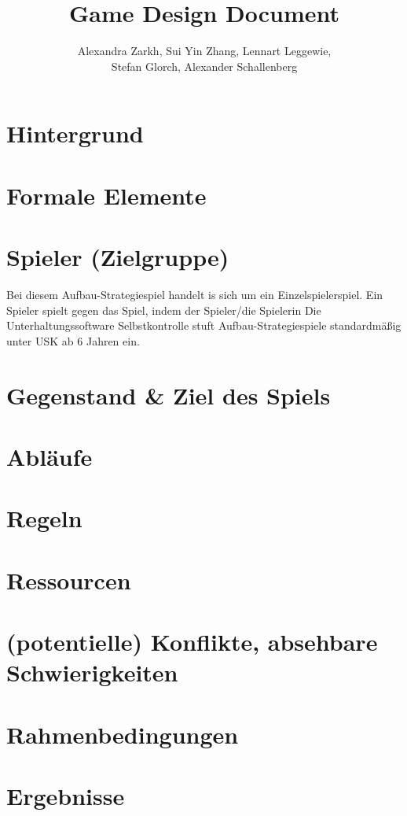 \documentclass[paper=A4,pagesize=auto,12pt,headinclude=true,footinclude=true,BCOR=0mm,DIV=calc]{scrartcl}
\title{Game Design Document}
\author{Alexandra Zarkh, Sui Yin Zhang, Lennart Leggewie,\\ Stefan Glorch, Alexander Schallenberg}
\newcommand{\sectionspace}{
	\vspace{0.5cm}
}
\begin{document}
	
\begin{titlepage}
	\maketitle
\end{titlepage}


\tableofcontents
\newpage

\section{Hintergrund}\label{sec:Hintergrund}

\sectionspace
\section{Formale Elemente}\label{sec:Formale_Elemente}

\sectionspace
\section{Spieler (Zielgruppe)}\label{sec:Spieler}
Bei diesem Aufbau-Strategiespiel handelt is sich um ein Einzelspielerspiel. Ein Spieler spielt gegen das Spiel, indem der Spieler/die Spielerin
Die Unterhaltungssoftware Selbstkontrolle stuft Aufbau-Strategiespiele standardmäßig unter USK ab 6 Jahren \cite{usk_6} ein.

\sectionspace
\section{Gegenstand \& Ziel des Spiels}\label{sec:Gegenstand}

\sectionspace
\section{Abläufe}\label{sec:Ablaeufe}

\sectionspace
\section{Regeln}\label{sec:Regeln}

\sectionspace
\section{Ressourcen}\label{sec:Ressourcen}

\sectionspace
\section{(potentielle) Konflikte, absehbare Schwierigkeiten}\label{sec:Konflikte}

\sectionspace
\section{Rahmenbedingungen}\label{sec:Rahmenbedingungen}

\sectionspace
\section{Ergebnisse}\label{sec:Ergebnisse}

\sectionspace
\printbibliography[heading=bibnumbered, title=Referenzen]\label{sec:Referenzen}
\end{document}
